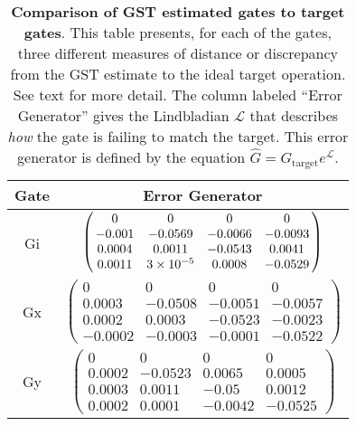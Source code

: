 {\begin{table}[h]
\begin{center}
\vspace{2em}
\begin{tabular}[l]{|c|c|}
\hline
Gate & Error Generator \\ \hline
Gi & $ \left(\!\!\begin{array}{cccc}
0 & 0 & 0 & 0 \\ 
-0.001 & -0.0569 & -0.0066 & -0.0093 \\ 
0.0004 & 0.0011 & -0.0543 & 0.0041 \\ 
0.0011 & 3\times 10^{-5} & 0.0008 & -0.0529
 \end{array}\!\!\right) $
 \\ \hline
Gx & $ \left(\!\!\begin{array}{cccc}
0 & 0 & 0 & 0 \\ 
0.0003 & -0.0508 & -0.0051 & -0.0057 \\ 
0.0002 & 0.0003 & -0.0523 & -0.0023 \\ 
-0.0002 & -0.0003 & -0.0001 & -0.0522
 \end{array}\!\!\right) $
 \\ \hline
Gy & $ \left(\!\!\begin{array}{cccc}
0 & 0 & 0 & 0 \\ 
0.0002 & -0.0523 & 0.0065 & 0.0005 \\ 
0.0003 & 0.0011 & -0.05 & 0.0012 \\ 
0.0002 & 0.0001 & -0.0042 & -0.0525
 \end{array}\!\!\right) $
 \\ \hline
\end{tabular}

\caption{\textbf{Comparison of GST estimated gates to target gates}.  This table presents, for each of the gates, three different measures of distance or discrepancy from the GST estimate to the ideal target operation.  See text for more detail.  The column labeled ``Error Generator'' gives the Lindbladian $\mathcal{L}$ that describes \emph{how} the gate is failing to match the target.  This error generator is defined by the equation $\hat{G} = G_{\mathrm{target}}e^{\mathcal{L}}$. \label{bestCPTPGatesetVsTargetTable}}
\end{center}
\end{table}

}
